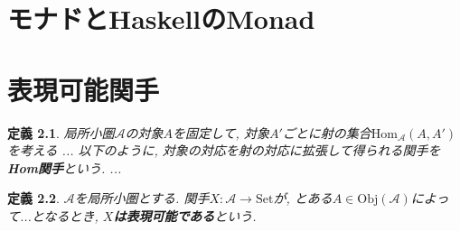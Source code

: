 \documentclass{jsbook}
\theoremstyle{plain}
\newtheorem{Def}{定義}[chapter]
\begin{document}
\chapter{モナドとHaskellのMonad}
\chapter{表現可能関手}
\begin{Def}
局所小圏$\mathscr{A}$の対象$A$を固定して, 対象$A'$ごとに射の集合$\mathrm{Hom}_{\mathscr{A}}(A,A')$を考える
...
以下のように, 対象の対応を射の対応に拡張して得られる関手を{\bf Hom関手}という.
...
\end{Def}
\begin{Def}
$\mathscr{A}$を局所小圏とする.
関手$X:\mathscr{A}\rightarrow\mathrm{Set}$が, とある$A\in\mathrm{Obj}(\mathscr{A})$によって...となるとき,
{\bf $X$は表現可能である}という.
\end{Def}
\printindex
\end{document}
